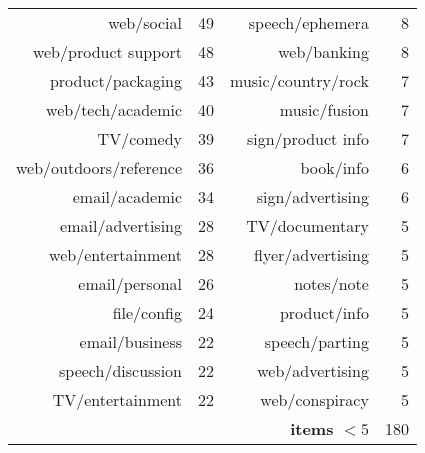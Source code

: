 \begin{table}[htb]
\begin{tabular}{r r || r r}
      web/social &  49 & speech/ephemera &   8  \\
      web/product support &  48 & web/banking &   8  \\
      product/packaging &  43 & music/country/rock &   7  \\
      web/tech/academic &  40 & music/fusion &   7  \\
      TV/comedy &  39 & sign/product info &   7  \\
      web/outdoors/reference &  36 & book/info &   6  \\
      email/academic &  34 & sign/advertising &   6  \\
      email/advertising &  28 & TV/documentary &   5  \\
      web/entertainment &  28 & flyer/advertising &   5 \\ 
      email/personal &  26 & notes/note &   5  \\
      file/config &  24 & product/info &   5  \\
      email/business &  22 & speech/parting &   5  \\
      speech/discussion &  22 & web/advertising &   5  \\
      TV/entertainment &  22 & web/conspiracy &   5  \\
      & & \textbf{items $< 5$} & 180 \\


\end{tabular}
\end{table}
